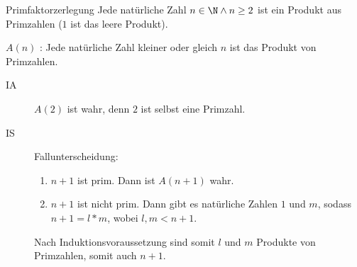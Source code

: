 \begin{satz}{Primfaktorzerlegung}
  Jede natürliche Zahl $n\in\N \wedge n\geq2$ ist ein Produkt aus Primzahlen ($1$ ist das leere Produkt).
\end{satz}

\beweis
$A(n)$ : \glqq Jede natürliche Zahl kleiner oder gleich $n$ ist das Produkt von Primzahlen.\grqq

\begin{description}
  \item[IA] $A(2)$ ist wahr, denn $2$ ist selbst eine Primzahl.
  \item[IS] Fallunterscheidung:
  \begin{enumerate}
    \item $n+1$ ist prim. Dann ist $A(n+1)$ wahr.
    \item $n+1$ ist nicht prim. Dann gibt es natürliche Zahlen $1$ und $m$, sodass $n+1=l* m$, wobei $l,m<n+1$.
  \end{enumerate}
  Nach Induktionsvoraussetzung sind somit $l$ und $m$ Produkte von Primzahlen, somit auch $n+1$.
\end{description}
